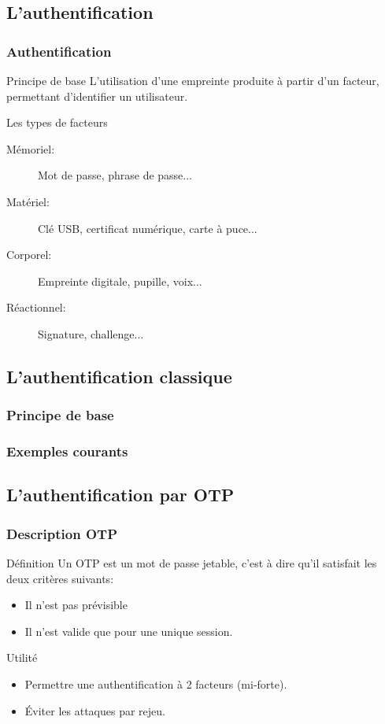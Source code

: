 \documentclass[xcolor=table]{beamer}
\begin{document}
\subsection{L'authentification}
\begin{frame}
\frametitle{Authentification}
\begin{block}{Principe de base}
L'utilisation d'une empreinte produite à partir d'un facteur, permettant d'identifier un utilisateur.
\end{block}
\begin{block}{Les types de facteurs}
\begin{description}
\item[Mémoriel:] Mot de passe, phrase de passe...
\item[Matériel:] Clé USB, certificat numérique, carte à puce...
\item[Corporel:] Empreinte digitale, pupille, voix...
\item[Réactionnel:] Signature, challenge...
\end{description}
\end{block}
\end{frame}


\subsection{L'authentification classique}
\begin{frame}
\frametitle{Principe de base}
\end{frame}

\begin{frame}
\frametitle{Exemples courants}
\end{frame}



\subsection{L'authentification par OTP}

\begin{frame}
\frametitle{Description OTP}
\begin{block}{Définition}
    Un OTP est un mot de passe jetable, c'est à dire qu'il satisfait les deux 
  critères suivants:
  \begin{itemize}
    \item Il n'est pas prévisible
    \item Il n'est valide que pour une unique session.
  \end{itemize}
\end{block}

\begin{block}{Utilité}
  \begin{itemize}
    \item Permettre une authentification à 2 facteurs (mi-forte).
    \item Éviter les attaques par rejeu.
  \end{itemize}
\end{block}
\end{frame}
\end{document}
